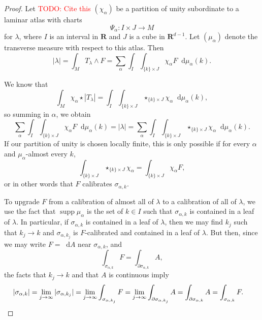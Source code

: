\documentclass[reqno,11pt]{amsart}
\newcommand{\RR}{\mathbf{R}}
\newcommand*\dif{\mathop{}\!\mathrm{d}}
\DeclareMathOperator{\supp}{supp}
\theoremstyle{definition}
\numberwithin{equation}{section}
\newcommand\todo[1]{\textcolor{red}{TODO: #1}}
\begin{document}
\begin{proof}
Let \todo{Cite this} $(\chi_\alpha)$ be a partition of unity subordinate to a laminar atlas with charts
$$\Psi_\alpha: I \times J \to M$$
for $\lambda$, where $I$ is an interval in $\RR$ and $J$ is a cube in $\RR^{d - 1}$.
Let $(\mu_\alpha)$ denote the transverse measure with respect to this atlas.
Then 
$$|\lambda| = \int_M T_\lambda \wedge F = \sum_\alpha \int_I \int_{\{k\} \times J} \chi_\alpha F \dif \mu_\alpha(k).$$

We know that 
$$\int_M \chi_\alpha \star |T_\lambda| = \int_I \int_{\{k\} \times J} \star_{\{k\} \times J} \chi_\alpha \dif \mu_\alpha(k),$$
so summing in $\alpha$, we obtain 
$$\sum_\alpha \int_I \int_{\{k\} \times J} \chi_\alpha F \dif \mu_\alpha(k) = |\lambda| = \sum_\alpha \int_I \int_{\{k\} \times J} \star_{\{k\} \times J} \chi_\alpha \dif \mu_\alpha(k).$$
If our partition of unity is chosen locally finite, this is only possible if for every $\alpha$ and $\mu_\alpha$-almost every $k$, 
$$\int_{\{k\} \times J} \star_{\{k\} \times J} \chi_\alpha = \int_{\{k\} \times J} \chi_\alpha F,$$
or in other words that $F$ calibrates $\sigma_{\alpha, k}$.

To upgrade $F$ from a calibration of almost all of $\lambda$ to a calibration of all of $\lambda$, we use the fact that $\supp \mu_\alpha$ is the set of $k \in I$ such that $\sigma_{\alpha, k}$ is contained in a leaf of $\lambda$.
In particular, if $\sigma_{\alpha, k}$ is contained in a leaf of $\lambda$, then we may find $k_j$ such that $k_j \to k$ and $\sigma_{\alpha, k_j}$ is $F$-calibrated and contained in a leaf of $\lambda$.
But then, since we may write $F = \dif A$ near $\sigma_{\alpha, k}$, and 
$$\int_{\sigma_{\alpha, k}} F = \int_{\partial \sigma_{\alpha, k}} A,$$
the facts that $k_j \to k$ and that $A$ is continuous imply 
\begin{align*}
|\sigma_{\alpha, k}| &= \lim_{j \to \infty} |\sigma_{\alpha, k_j}| = \lim_{j \to \infty} \int_{\sigma_{\alpha, k_j}} F = \lim_{j \to \infty} \int_{\partial \sigma_{\alpha, k_j}} A = \int_{\partial \sigma_{\alpha, k}} A = \int_{\sigma_{\alpha, k}} F. \qedhere 
\end{align*}
\end{proof}
\end{document}
